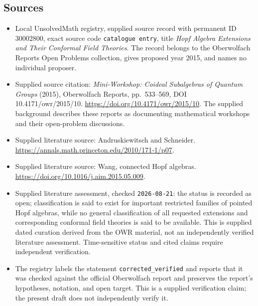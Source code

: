 \documentclass[11pt]{article}
\begin{document}
\subsection{Sources}
\begin{itemize}
\item Local UnsolvedMath registry, supplied source record with permanent ID \(30002800\), exact source code \texttt{catalogue entry}, title \emph{Hopf Algebra Extensions and Their Conformal Field Theories}. The record belongs to the Oberwolfach Reports Open Problems collection, gives proposed year 2015, and names no individual proposer.
\item Supplied source citation: \emph{Mini-Workshop: Coideal Subalgebras of Quantum Groups} (2015), Oberwolfach Reports, pp.~533--569, DOI 10.4171/owr/2015/10. \url{https://doi.org/10.4171/owr/2015/10}. The supplied background describes these reports as documenting mathematical workshops and their open-problem discussions.
\item Supplied literature source: Andruskiewitsch and Schneider. \url{https://annals.math.princeton.edu/2010/171-1/p07}.
\item Supplied literature source: Wang, connected Hopf algebras. \url{https://doi.org/10.1016/j.aim.2015.05.009}.
\item Supplied literature assessment, checked \texttt{2026-08-21}: the status is recorded as open; classification is said to exist for important restricted families of pointed Hopf algebras, while no general classification of all requested extensions and corresponding conformal field theories is said to be available. This is supplied dated curation derived from the OWR material, not an independently verified literature assessment. Time-sensitive status and cited claims require independent verification.
\item The registry labels the statement \texttt{corrected\_verified} and reports that it was checked against the official Oberwolfach report and preserves the report's hypotheses, notation, and open target. This is a supplied verification claim; the present draft does not independently verify it.
\end{itemize}
\end{document}
